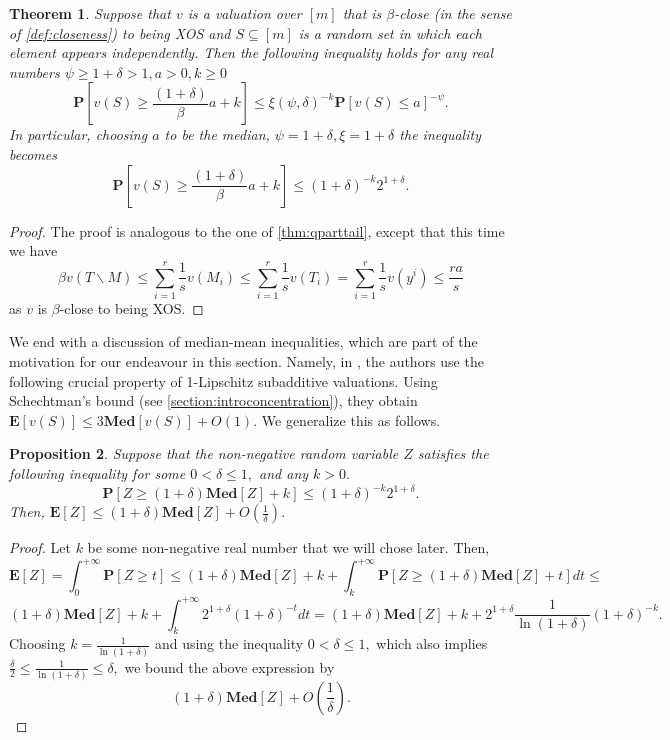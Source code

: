 \documentclass[11pt]{article}\usepackage{amsfonts}
\newtheorem{theorem}{Theorem}
\newtheorem{proposition}[theorem]{Proposition}
\numberwithin{theorem}{subsection}
\newcommand{\prob}{\mathbf{P}}
\newcommand{\median}{\mathbf{Med}}
\newcommand{\expect}{\mathbf{E}}
\begin{document}
\begin{theorem}
\label{thm:tailboundxos}
    Suppose that $v$ is a valuation over $[m]$ that is $\beta$-close (in the sense of \cref{def:closeness}) to being XOS and $S\subseteq [m]$ is a random set in which each element appears independently. Then the following inequality holds for any real numbers $\psi\ge 1+\delta>1,a>0, k\ge 0$
    $$
    \prob[v(S)\ge \frac{(1+\delta)}{\beta}a+k]\le 
    \xi(\psi, \delta)^{-k}\prob[v(S)\le a]^{-\psi}.
    $$
    In particular, choosing $a$ to be the median, $\psi = 1+\delta,\xi = 1+\delta$ the inequality becomes
    $$
    \prob[v(S)\ge \frac{(1+\delta)}{\beta}a+k]\le 
    \left(1+\delta\right)^{-k}2^{1+\delta}.
    $$
\end{theorem}
\begin{proof}
The proof is analogous to the one of \cref{thm:qparttail}, except that this time we have 
$$
\beta v(T\backslash M)\le \sum_{i=1}^r \frac{1}{s}v(M_i)\le 
\sum_{i=1}^r \frac{1}{s}v(T_i) = 
\sum_{i=1}^r \frac{1}{s}v(y^i)
\le 
\frac{ra}{s}
$$
as $v$ is $\beta$-close to being XOS.
\end{proof}


\noindent
We end with a discussion of median-mean inequalities, which are part of the motivation for our endeavour in this section. Namely, in \cite{RubinsteinW18}, the authors use the following crucial property of 1-Lipschitz subadditive valuations. Using Schechtman's bound (see \cref{section:introconcentration}), they obtain
$\expect[v(S)]\le 
3\median[v(S)] + O(1)
.$ We generalize this as follows.

\begin{proposition}
\label{prop:mediantomean}
Suppose that the non-negative random variable $Z$ satisfies the following inequality for some $0<\delta\le 1,$ and any $k >0.$
$$
\prob[Z\ge (1 + \delta)\median[Z] + k]\le 
(1+\delta)^{-k}2^{1+\delta}.
$$
Then, $\expect[Z]\le (1 + \delta)\median[Z] + O(\frac{1}{\delta}).$
\end{proposition}
\begin{proof}
Let $k$ be some non-negative real number that we will chose later. Then, 
$$
\expect[Z] = 
\int_0^{+\infty}
\prob[Z\ge t]\le 
(1 + \delta)\median[Z] + k
+
\int_{k}^{+\infty}
\prob[Z\ge (1 + \delta)\median[Z] + t]d t\le 
$$
$$
(1 + \delta)\median[Z] + k
+
\int_{k}^{+\infty}
2^{1+\delta}(1+\delta)^{-t}dt = 
(1 + \delta)\median[Z] + k
+
2^{1+\delta}\frac{1}{\ln (1 + \delta)}(1+\delta)^{-k}.
$$
Choosing $k = \frac{1}{\ln(1+\delta)}$ and using the inequality 
$0 <\delta \le 1,$ which also implies 
$\frac{\delta}{2}\le \frac{1}{\ln (1+\delta)}\le \delta,$ we bound the above expression by 
$$
(1 + \delta)\median[Z] + O\left(\frac{1}{\delta}\right).
$$
\end{proof}
\end{document}
